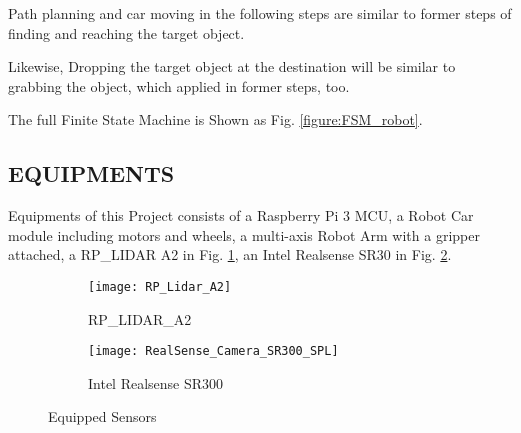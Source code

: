 Path planning and car moving in the following steps are similar to former steps of finding and reaching the target object. 

Likewise, Dropping the target object at the destination will be similar to grabbing the object, which applied in former steps, too. 

The full Finite State Machine is Shown as Fig. \ref{figure:FSM_robot}.


\subsection{EQUIPMENTS}

Equipments of this Project consists of a Raspberry Pi 3 MCU, a Robot Car module including motors and wheels, a multi-axis Robot Arm with a gripper attached, a RP\_LIDAR A2 in Fig. \ref{figure:RP_Lidar_A2}, an Intel Realsense SR30 in Fig. \ref{figure:RealSense_Camera_SR300_SPL}.

\begin{figure}[h]
\centering
    \begin{subfigure}[b]{0.4\columnwidth}
    \texttt{[image: RP\_Lidar\_A2]}
    \caption{RP\_LIDAR\_A2}
    \label{figure:RP_Lidar_A2}
    \end{subfigure}
    \begin{subfigure}[b]{0.4\columnwidth}
    \texttt{[image: RealSense\_Camera\_SR300\_SPL]}
    \caption{Intel Realsense SR300}
    \label{figure:RealSense_Camera_SR300_SPL}
    \end{subfigure}
\caption{Equipped Sensors}
\label{figure:sensors}
\end{figure}





%

%
